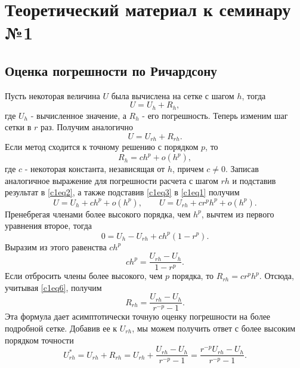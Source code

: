 \section{Теоретический материал к семинару №1}

\subsection{Оценка погрешности по Ричардсону}
Пусть некоторая величина $U$ была вычислена на сетке с шагом $h$, тогда
\begin{equation} \label{c1eq1}
	U = U_h + R_h,
\end{equation}
где $U_h$ - вычисленное значение, а $R_h$ - его погрешность. Теперь изменим шаг сетки в $r$ раз. Получим аналогично
\begin{equation} \label{c1eq2}
	U = U_{rh} + R_{rh}.
\end{equation}
Если метод сходится к точному решению с порядком $p$, то
\begin{equation} \label{c1eq3}
	R_h = ch^p + o(h^p),
\end{equation}
где $c$ - некоторая константа, независящая от $h$, причем $c \neq 0$.
Записав аналогичное выражение для погрешности расчета с шагом $rh$ и подставив результат в \eqref{c1eq2}, а также подставив \eqref{c1eq3} в \eqref{c1eq1} получим
\begin{equation} \label{c1eq4}
	U = U_h + ch^p + o(h^p),
	\qquad 
	U = U_{rh} + cr^ph^p + o(h^p).
\end{equation}
Пренебрегая членами более высокого порядка, чем $h^p$, вычтем из первого уравнения второе, тогда
\begin{equation} \label{c1eq5}
	0 = U_h - U_{rh} + ch^p(1-r^p).
\end{equation}
Выразим из этого равенства $ch^p$
\begin{equation} \label{c1eq6}
	ch^p = \frac{U_{rh} - U_h}{1 - r^p}.
\end{equation}
Если отбросить члены более высокого, чем $p$ порядка, то $R_{rh} = cr^ph^p$. Отсюда, учитывая \eqref{c1eq6}, получим
\begin{equation} \label{c1eq7}
	R_{rh} = \frac{U_{rh} - U_h}{r^{-p} - 1}.
\end{equation}
Эта формула дает асимптотически точную оценку погрешности на более подробной сетке. Добавив ее к $U_{rh}$, мы можем получить ответ с более высоким порядком точности
\begin{equation} \label{c1eq8}
	U_{rh}^* = U_{rh} + R_{rh} = U_{rh} + \frac{U_{rh} - U_h}{r^{-p} - 1} = \frac{r^{-p}U_{rh} - U_h}{r^{-p} - 1}.
\end{equation}

